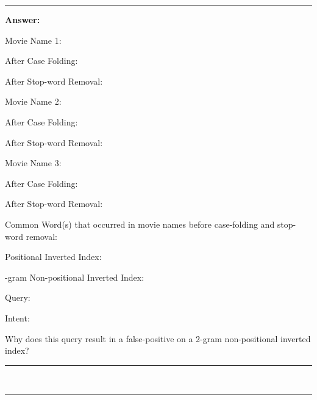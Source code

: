 \documentclass[12pt]{article}
\begin{document}
\bigskip

\hrule

\bigskip

\textbf{Answer:}

\bigskip

Movie Name 1: 

After Case Folding: 

After Stop-word Removal:

\bigskip

Movie Name 2:

After Case Folding: 

After Stop-word Removal:

\bigskip

Movie Name 3:

After Case Folding: 

After Stop-word Removal:

\bigskip

Common Word(s) that occurred in movie names before case-folding and stop-word removal: 

\bigskip

Positional Inverted Index:

\vspace*{5cm}

-gram Non-positional Inverted Index:

\vspace*{5cm}

\bigskip

Query:

Intent:

Why does this query result in a false-positive on a 2-gram non-positional inverted index?

\bigskip

\vspace*{4cm}

\hrule

~\smallskip{}

\hrule
\end{document}
